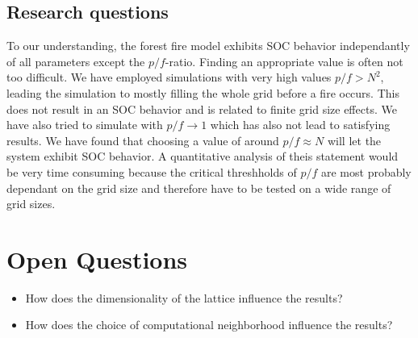 \documentclass[11pt]{article}
\begin{document}
\subsection{Research questions}

To our understanding, the forest fire model exhibits SOC behavior independantly of all parameters except the $p/f$-ratio. Finding an appropriate value is often not too difficult. We have employed simulations with very high values $p/f>N^{2}$, leading the simulation to mostly filling the whole grid before a fire occurs. This does not result in an SOC behavior and is related to finite grid size effects. We have also tried to simulate with $p/f \rightarrow 1$ which has also not lead to satisfying results. We have found that choosing a value of around $p/f \approx N$ will let the system exhibit SOC behavior. A quantitative analysis of theis statement would be very time consuming because the critical threshholds of $p/f$ are most probably dependant on the grid size and therefore have to be tested on a wide range of grid sizes.



\section{Open Questions}
\begin{itemize}
\item How does the dimensionality of the lattice influence the results?
\item How does the choice of computational neighborhood influence the results?



\end{itemize}
\end{document}

